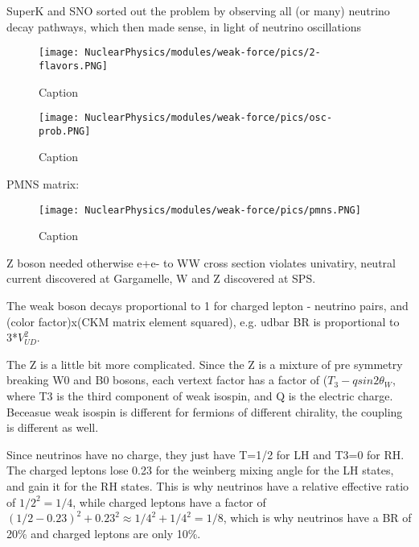             SuperK and SNO sorted out the problem by observing all (or many) neutrino decay pathways, which then made sense, in light of neutrino oscillations
            
            \begin{figure}[H]
                \centering
                \texttt{[image: NuclearPhysics/modules/weak-force/pics/2-flavors.PNG]}
            \caption{Caption}
            \end{figure}
            
            
            \begin{figure}[H]
                \centering
                \texttt{[image: NuclearPhysics/modules/weak-force/pics/osc-prob.PNG]}
            \caption{Caption}
            \end{figure}
            
            
            
            PMNS matrix:
            
            \begin{figure}[H]
                \centering
                \texttt{[image: NuclearPhysics/modules/weak-force/pics/pmns.PNG]}
            \caption{Caption}
            \end{figure}
            
            
            
        Z boson needed otherwise e+e- to WW cross section violates univatiry, neutral current discovered at Gargamelle, W and Z discovered at SPS.
        
        The weak boson decays proportional to 1 for charged lepton - neutrino pairs, and (color factor)x(CKM matrix element squared), e.g. udbar BR is proportional to 3*$V_{UD}^2$.
        
        The Z is a little bit more complicated. Since the Z is a mixture of pre symmetry breaking W0 and B0 bosons, each vertext factor has a factor of ($T_3 - qsin2\theta_W$, where T3 is the third component of weak isospin, and Q is the electric charge. Beceasue weak isospin is different for fermions of different chirality, the coupling is different as well.
        
        Since neutrinos have no charge, they just have T=1/2 for LH and T3=0 for RH. The charged leptons lose 0.23 for the weinberg mixing angle for the LH states, and gain it for the RH states. This is why neutrinos have a relative effective ratio of $1/2^2 = 1/4$, while charged leptons have a factor of $(1/2 - 0.23)^2 + 0.23^2 \approx 1/4^2 + 1/4^2 = 1/8$, which is why neutrinos have a BR of 20\% and charged leptons are only 10\%. 
        
